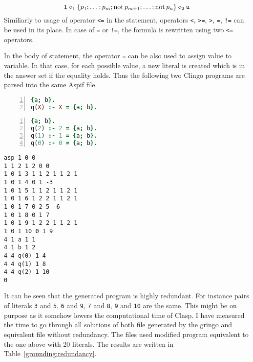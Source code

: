 \documentclass[
    digital,
    color,
    oneside,
    sansbold,
    lot,
    nolof
]{fithesis}
\begin{document}
\begin{equation*}
    \texttt{l} \diamond_1 \{p_1; \dots; p_m; \mathrm{not}\, p_{m+1}; \dots; \mathrm{not}\, p_n\} \diamond_2 \texttt{u}
\end{equation*}
Similiarly to usage of operator \texttt{<=} in the statement, operators
\texttt{<}, \texttt{>=}, \texttt{>}, \texttt{=}, \texttt{!=} can be used in its
place. In case of \texttt{=} or \texttt{!=}, the formula is rewritten using two
\texttt{<=} operators.

In the body of statement, the operator \texttt{=} can be also used to assign
value to variable. In that case, for each possible value, a new literal is
created which is in the answer set if the equality holds. Thus the following
two Clingo programs are parsed into the same Aspif file.

\begin{minipage}[t]{0.45\linewidth}
\centering
\begin{lstlisting}[language=prolog, numbers=left, countblanklines=false]
{a; b}.
q(X) :- X = {a; b}.
\end{lstlisting}
\begin{lstlisting}[language=prolog, numbers=left, countblanklines=false]
{a; b}.
q(2) :- 2 = {a; b}.
q(1) :- 1 = {a; b}.
q(0) :- 0 = {a; b}.
\end{lstlisting}
\end{minipage}
\hspace{1em}
\begin{minipage}[t]{0.45\linewidth}
\centering
\begin{lstlisting}[numbers=right, countblanklines=false]
asp 1 0 0
1 1 2 1 2 0 0
1 0 1 3 1 1 2 1 1 2 1
1 0 1 4 0 1 -3
1 0 1 5 1 1 2 1 1 2 1
1 0 1 6 1 2 2 1 1 2 1
1 0 1 7 0 2 5 -6
1 0 1 8 0 1 7
1 0 1 9 1 2 2 1 1 2 1
1 0 1 10 0 1 9
4 1 a 1 1
4 1 b 1 2
4 4 q(0) 1 4
4 4 q(1) 1 8
4 4 q(2) 1 10
0
\end{lstlisting}
\end{minipage}

It can be seen that the generated program is highly redundant. For instance
pairs of literals \texttt{3} and \texttt{5}, \texttt{6} and \texttt{9},
\texttt{7} and \texttt{8}, \texttt{9} and \texttt{10} are the same.
This might be on purpose as it somehow lowers the computational time of Clasp.
I have measured the time to go through all solutions of both file generated by
the gringo and equivalent file without redundancy. The files used modified
program equivalent to the one above with 20 literals.
The results are written in Table~\ref{grounding:redundancy}.
\end{document}
